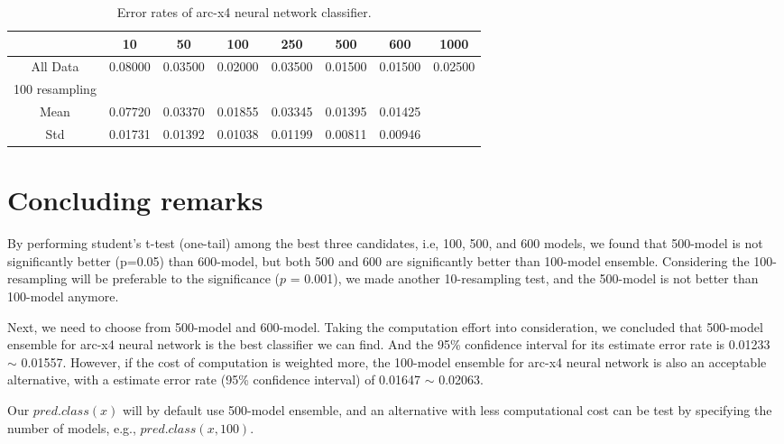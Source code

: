 \documentclass[a4paper,12pt]{article}
\begin{document}
\begin{table}
\begin{center}
\caption[arc-nnet]{Error rates of arc-x4 neural network classifier.}
\label{perftab}
\begin{tabular}{cccccccc}
\hline
         & 10    & 50    & 100   & 250   & 500   & 600   & 1000 \\
\hline
All Data & 0.08000 & 0.03500 & 0.02000 & 0.03500 & 0.01500 & 0.01500 & 0.02500 \\
100 resampling & & & & & & & \\
Mean & 0.07720 & 0.03370 & 0.01855 & 0.03345 & 0.01395 & 0.01425 & \\
Std  & 0.01731 & 0.01392 & 0.01038 & 0.01199 & 0.00811 & 0.00946 & \\
\hline
\end{tabular}
\end{center}
\end{table}


\section{Concluding remarks}
By performing student's t-test (one-tail) among the best three candidates, i.e, 100, 500, and 600 models, we found that 500-model is not significantly better (p=0.05) than 600-model, but both 500 and 600 are significantly better than 100-model ensemble.  Considering the 100-resampling will be preferable to the significance ($p$ = 0.001), we made another 10-resampling test, and the 500-model is not better than 100-model anymore.

Next, we need to choose from 500-model and 600-model.  Taking the computation effort into consideration, we concluded that 500-model ensemble for arc-x4 neural network is the best classifier we can find.  And the 95\% confidence interval for its estimate error rate is 0.01233 $\sim$ 0.01557.  However, if the cost of computation is weighted more, the 100-model ensemble for arc-x4 neural network is also an acceptable alternative, with a estimate error rate (95\% confidence interval) of  
0.01647 $\sim$ 0.02063.

Our $pred.class(x)$ will by default use 500-model ensemble, and an alternative with less computational cost can be test by specifying the number of models, e.g., $pred.class(x, 100)$.
\end{document}
